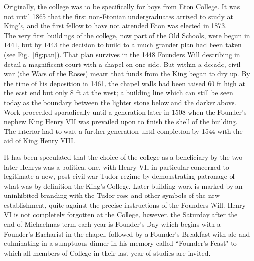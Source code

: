 \documentclass{report}
\begin{document}
Originally, the college was to be specifically for boys from Eton College. It was not until 1865 that the first non-Etonian undergraduates arrived to study at King's, and the first fellow to have not attended Eton was elected in 1873. \\




\vspace{10pt}
The very first buildings of the college, now part of the Old Schools, were begun in 1441, but by 1443 the decision to build to a much grander plan had been taken (see Fig.~\ref{fig:pan}). That plan survives in the 1448 Founders Will describing in detail a magnificent court with a chapel on one side. But within a decade, civil war (the Wars of the Roses) meant that funds from the King began to dry up. By the time of his deposition in 1461, the chapel walls had been raised 60 ft high at the east end but only 8 ft at the west; a building line which can still be seen today as the boundary between the lighter stone below and the darker above. Work proceeded sporadically until a generation later in 1508 when the Founder's nephew King Henry VII was prevailed upon to finish the shell of the building. The interior had to wait a further generation until completion by 1544 with the aid of King Henry VIII.



It has been speculated that the choice of the college as a beneficiary by the two later Henrys was a political one, with Henry VII in particular concerned to legitimate a new, post-civil war Tudor regime by demonstrating patronage of what was by definition the King's College. Later building work is marked by an uninhibited branding with the Tudor rose and other symbols of the new establishment, quite against the precise instructions of the Founders Will. Henry VI is not completely forgotten at the College, however, the Saturday after the end of Michaelmas term each year is Founder's Day which begins with a Founder's Eucharist in the chapel, followed by a Founder's Breakfast with ale and culminating in a sumptuous dinner in his memory called ``Founder's Feast" to which all members of College in their last year of studies are invited.
\end{document}
